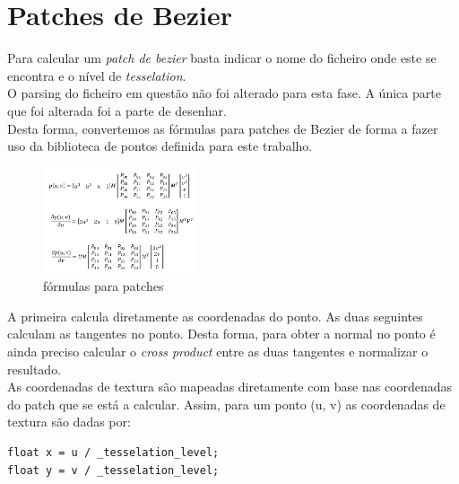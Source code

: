 \documentclass[a4paper]{report}
\begin{document}
\section{Patches de Bezier}
Para calcular um \textit{patch de bezier} basta indicar  o nome do ficheiro onde
este se encontra e o nível de \textit{tesselation}.\\
O parsing do ficheiro em questão não foi alterado para esta fase. A única parte
que foi alterada foi a parte de desenhar.\\
Desta forma, convertemos as fórmulas para patches de Bezier de forma a fazer uso
da biblioteca de pontos definida para este trabalho.\\
\begin{figure}[H]
    \centering 
    \includegraphics[width=0.4\textwidth]{images/formulas_patches.png}  
    \caption{fórmulas para patches}
\end{figure}
A primeira calcula diretamente as coordenadas do ponto. As duas seguintes
calculam as tangentes no ponto. Desta forma, para obter a normal no ponto é
ainda preciso calcular o \textit{cross product} entre as duas tangentes e
normalizar o resultado.\\
As coordenadas de textura são mapeadas diretamente com base nas coordenadas do
patch que se está a calcular. Assim, para um ponto (u, v) as coordenadas de
textura são dadas por:
\begin{lstlisting}
float x = u / _tesselation_level;
float y = v / _tesselation_level;
\end{lstlisting}
\end{document}
